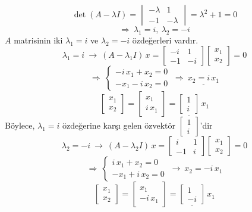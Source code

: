 \documentclass[11pt,a4paper]{article}
\begin{document}
\begin{cozum}
\[ \det(A-\lambda I)=\begin{vmatrix}-\lambda&1\\-1&-\lambda\end{vmatrix}=\lambda^2+1=0 \]
\[ \Rightarrow\ \lambda_1=i,\ \lambda_2=-i \]
$A$ matrisinin iki $\lambda_1=i$ ve $\lambda_2=-i$ özdeğerleri vardır.
\[
  \lambda_1=i \ \rightarrow\ (A-\lambda_1 I)\,x=\begin{bmatrix}-i&1\\-1&-i\end{bmatrix}\begin{bmatrix}x_1\\x_2\end{bmatrix}=0
\]
\[
  \Rightarrow\ \begin{cases}-i\,x_1+x_2=0\\-x_1-i\,x_2=0\end{cases}
  \ \Rightarrow\ \underline{x_2=i\,x_1}
\]
\[
  \begin{bmatrix}x_1\\x_2\end{bmatrix}=\begin{bmatrix}x_1\\i\,x_1\end{bmatrix}
  =\underline{\begin{bmatrix}1\\i\end{bmatrix}}\,x_1
\]
Böylece, \underline{$\lambda_1=i$} özdeğerine karşı gelen özvektör \underline{$\begin{bmatrix}1\\i\end{bmatrix}$}'dir
\[
  \lambda_2=-i \ \rightarrow\ (A-\lambda_2 I)\,x=\begin{bmatrix}i&1\\-1&i\end{bmatrix}\begin{bmatrix}x_1\\x_2\end{bmatrix}=0
\]
\[
  \Rightarrow\ \begin{cases}i\,x_1+x_2=0\\-x_1+i\,x_2=0\end{cases}
  \ \rightarrow\ x_2=-i\,x_1
\]
\[
  \begin{bmatrix}x_1\\x_2\end{bmatrix}=\begin{bmatrix}x_1\\-i\,x_1\end{bmatrix}
  =\underline{\begin{bmatrix}1\\-i\end{bmatrix}}\,x_1
\]
\end{cozum}
\end{document}
